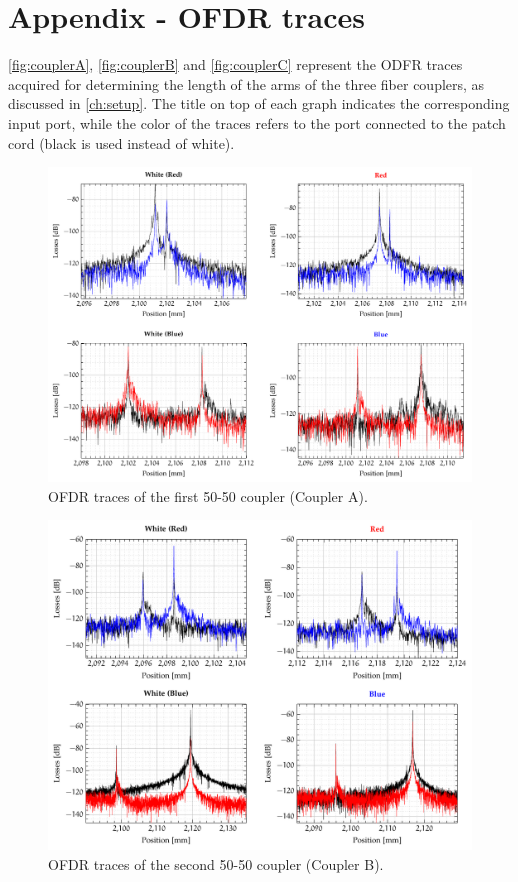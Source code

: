
\chapter{Appendix - OFDR traces}
\label{ch:appendixA}
 \autoref{fig:couplerA}, \autoref{fig:couplerB} and \autoref{fig:couplerC} represent the ODFR traces acquired for determining the length of the arms of the three fiber couplers, as discussed in \autoref{ch:setup}. The title on top of each graph indicates the corresponding input port, while the color of the traces refers to the port connected to the patch cord (black is used  instead of white).
 
\begin{figure}[hbt]
	\myfloatalign
	\includegraphics[width=\linewidth]{gfx/ch3/couplers/couplerA}
	\caption{OFDR traces of the first 50-50 coupler (Coupler A).}\label{fig:couplerA}
\end{figure}

\begin{figure}[hbt]
	\myfloatalign
	\includegraphics[width=\linewidth]{gfx/ch3/couplers/couplerB}
	\caption{OFDR traces of the second 50-50 coupler (Coupler B).}\label{fig:couplerB}
\end{figure}

